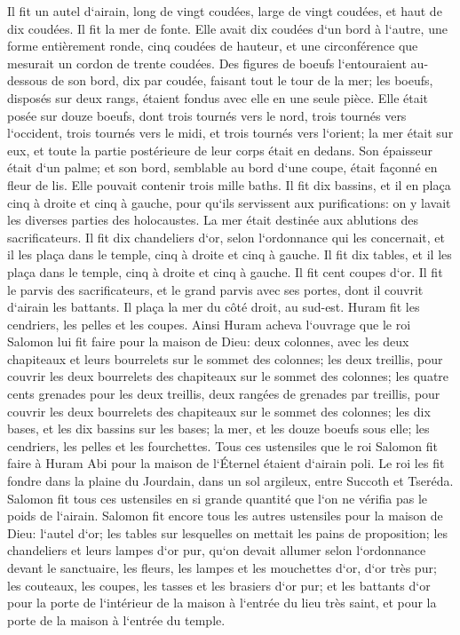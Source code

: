 \verse Il fit un autel d`airain, long de vingt coudées, large de vingt coudées, et haut de dix coudées. 
\verse Il fit la mer de fonte. Elle avait dix coudées d`un bord à l`autre, une forme entièrement ronde, cinq coudées de hauteur, et une circonférence que mesurait un cordon de trente coudées. 
\verse Des figures de boeufs l`entouraient au-dessous de son bord, dix par coudée, faisant tout le tour de la mer; les boeufs, disposés sur deux rangs, étaient fondus avec elle en une seule pièce. 
\verse Elle était posée sur douze boeufs, dont trois tournés vers le nord, trois tournés vers l`occident, trois tournés vers le midi, et trois tournés vers l`orient; la mer était sur eux, et toute la partie postérieure de leur corps était en dedans. 
\verse Son épaisseur était d`un palme; et son bord, semblable au bord d`une coupe, était façonné en fleur de lis. Elle pouvait contenir trois mille baths. 
\verse Il fit dix bassins, et il en plaça cinq à droite et cinq à gauche, pour qu`ils servissent aux purifications: on y lavait les diverses parties des holocaustes. La mer était destinée aux ablutions des sacrificateurs. 
\verse Il fit dix chandeliers d`or, selon l`ordonnance qui les concernait, et il les plaça dans le temple, cinq à droite et cinq à gauche. 
\verse Il fit dix tables, et il les plaça dans le temple, cinq à droite et cinq à gauche. Il fit cent coupes d`or. 
\verse Il fit le parvis des sacrificateurs, et le grand parvis avec ses portes, dont il couvrit d`airain les battants. 
\verse Il plaça la mer du côté droit, au sud-est. 
\verse Huram fit les cendriers, les pelles et les coupes. Ainsi Huram acheva l`ouvrage que le roi Salomon lui fit faire pour la maison de Dieu: 
\verse deux colonnes, avec les deux chapiteaux et leurs bourrelets sur le sommet des colonnes; les deux treillis, pour couvrir les deux bourrelets des chapiteaux sur le sommet des colonnes; 
\verse les quatre cents grenades pour les deux treillis, deux rangées de grenades par treillis, pour couvrir les deux bourrelets des chapiteaux sur le sommet des colonnes; 
\verse les dix bases, et les dix bassins sur les bases; 
\verse la mer, et les douze boeufs sous elle; 
\verse les cendriers, les pelles et les fourchettes. Tous ces ustensiles que le roi Salomon fit faire à Huram Abi pour la maison de l`Éternel étaient d`airain poli. 
\verse Le roi les fit fondre dans la plaine du Jourdain, dans un sol argileux, entre Succoth et Tseréda. 
\verse Salomon fit tous ces ustensiles en si grande quantité que l`on ne vérifia pas le poids de l`airain. 
\verse Salomon fit encore tous les autres ustensiles pour la maison de Dieu: l`autel d`or; les tables sur lesquelles on mettait les pains de proposition; 
\verse les chandeliers et leurs lampes d`or pur, qu`on devait allumer selon l`ordonnance devant le sanctuaire, 
\verse les fleurs, les lampes et les mouchettes d`or, d`or très pur; 
\verse les couteaux, les coupes, les tasses et les brasiers d`or pur; et les battants d`or pour la porte de l`intérieur de la maison à l`entrée du lieu très saint, et pour la porte de la maison à l`entrée du temple. 

